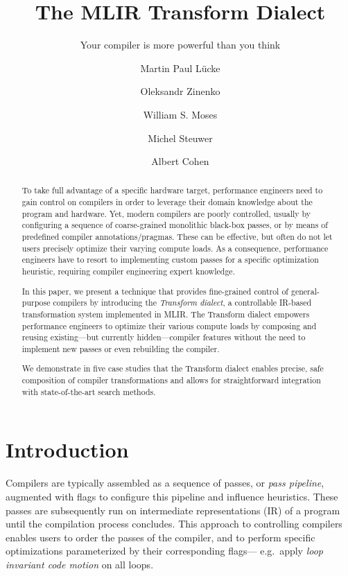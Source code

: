 \documentclass[screen,nonacm,authorversion]{acmart}
\title{The MLIR Transform Dialect}
\subtitle{Your compiler is more powerful than you think}
\author{Martin Paul Lücke}
\affiliation{
  \institution{University of Edinburgh}
  \city{Edinburgh}
  \state{Scotland}
  \country{UK}
}
\author{Oleksandr Zinenko}
\affiliation{
  \institution{Google DeepMind}
  \city{Paris}
  \country{France}
}
\author{William S. Moses}
\affiliation{
  \institution{Google DeepMind}
  \city{Cambridge}
  \state{MA}
  \country{~}
}
\affiliation{
  \institution{University of Illinois Urbana-Champaign}
  \state{IL}
  \country{United States}
}
\author{Michel Steuwer}
\affiliation{
  \institution{TU Berlin}
  \city{Berlin}
  \country{Germany}
}
\author{Albert Cohen}
\affiliation{
  \institution{Google DeepMind}
  \city{Paris}
  \country{France}
}
\begin{document}
\begin{abstract}

To take full advantage of a specific hardware target, performance engineers need to gain control on compilers in order to leverage their domain knowledge about the program and hardware.
Yet, modern compilers are poorly controlled, usually by configuring a sequence of coarse-grained monolithic black-box passes, or by means of predefined compiler annotations/pragmas. These can be effective, but often do not let users precisely optimize their varying compute loads.
As a consequence, performance engineers have to resort to implementing custom passes for a specific optimization heuristic, requiring compiler engineering expert knowledge.

In this paper, we present a technique that provides fine-grained control of general-purpose compilers by introducing the \emph{Transform dialect}, a controllable IR-based transformation system implemented in MLIR.
The Transform dialect empowers performance engineers to optimize their various compute loads by composing and reusing existing---but currently hidden---compiler features without the need to implement new passes or even rebuilding the compiler.

We demonstrate in five case studies that the Transform dialect enables precise, safe composition of compiler transformations and allows for straightforward integration with state-of-the-art search methods.

\end{abstract}

\maketitle

\section{Introduction}

Compilers are typically assembled as a sequence of passes, or \emph{pass pipeline}, augmented with flags to configure this pipeline and influence heuristics.
These passes are subsequently run on intermediate representations (IR) of a program until the compilation process concludes.
This approach to controlling compilers enables users to order the passes of the compiler, and to perform specific optimizations parameterized by their corresponding flags--- e.g.\ apply \emph{loop invariant code motion} on all loops.
\end{document}
